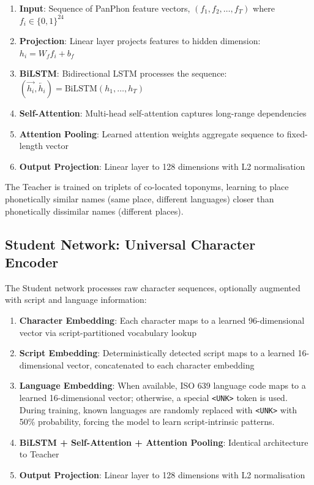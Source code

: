 \documentclass[11pt,a4paper]{article}
\newcommand{\embdim}{128}
\begin{document}
\begin{enumerate}
    \item \textbf{Input}: Sequence of PanPhon feature vectors, $(f_1, f_2, \ldots, f_T)$ where $f_i \in \{0,1\}^{24}$
    \item \textbf{Projection}: Linear layer projects features to hidden dimension: $h_i = W_f f_i + b_f$
    \item \textbf{BiLSTM}: Bidirectional LSTM processes the sequence: $(\overrightarrow{h_i}, \overleftarrow{h_i}) = \text{BiLSTM}(h_1, \ldots, h_T)$
    \item \textbf{Self-Attention}: Multi-head self-attention captures long-range dependencies
    \item \textbf{Attention Pooling}: Learned attention weights aggregate sequence to fixed-length vector
    \item \textbf{Output Projection}: Linear layer to \embdim{} dimensions with L2 normalisation
\end{enumerate}

The Teacher is trained on triplets of co-located toponyms, learning to place phonetically similar names (same place, different languages) closer than phonetically dissimilar names (different places).

\subsection{Student Network: Universal Character Encoder}

The Student network processes raw character sequences, optionally augmented with script and language information:

\begin{enumerate}
    \item \textbf{Character Embedding}: Each character maps to a learned 96-dimensional vector via script-partitioned vocabulary lookup
    \item \textbf{Script Embedding}: Deterministically detected script maps to a learned 16-dimensional vector, concatenated to each character embedding
    \item \textbf{Language Embedding}: When available, ISO 639 language code maps to a learned 16-dimensional vector; otherwise, a special \texttt{<UNK>} token is used. During training, known languages are randomly replaced with \texttt{<UNK>} with 50\% probability, forcing the model to learn script-intrinsic patterns.
    \item \textbf{BiLSTM + Self-Attention + Attention Pooling}: Identical architecture to Teacher
    \item \textbf{Output Projection}: Linear layer to \embdim{} dimensions with L2 normalisation
\end{enumerate}
\end{document}
